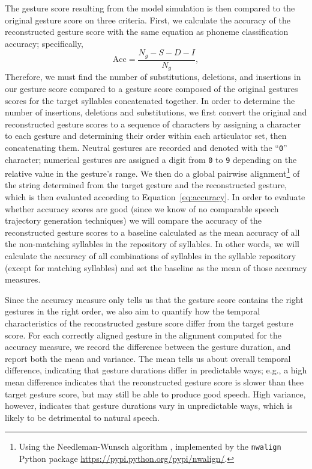 The gesture score resulting from the model simulation
is then compared to the original gesture score
on three criteria.
First, we calculate the accuracy
of the reconstructed gesture score
with the same equation as phoneme classification accuracy;
specifically,
\begin{equation} \label{eq:accuracy}
  \text{Acc} = \frac{N_g - S - D - I}{N_g},
\end{equation}
Therefore, we must find the number of
substitutions, deletions, and insertions
in our gesture score compared to
a gesture score composed of
the original gestures scores
for the target syllables
concatenated together.
In order to determine the number of
insertions, deletions and substitutions,
we first convert the original
and reconstructed gesture scores
to a sequence of characters
by assigning a character to each gesture
and determining their order
within each articulator set,
then concatenating them.
Neutral gestures are recorded
and denoted with the ``\texttt{0}'' character;
numerical gestures are assigned
a digit from \texttt{0} to \texttt{9}
depending on the relative value
in the gesture's range.
We then do a global pairwise alignment\footnote{
  Using the Needleman-Wunsch algorithm \cite{needleman1970},
  implemented by the \texttt{nwalign} Python package
  \url{https://pypi.python.org/pypi/nwalign/}.}
of the string determined
from the target gesture
and the reconstructed gesture,
which is then evaluated
according to Equation~\eqref{eq:accuracy}.
In order to evaluate whether
accuracy scores are good
(since we know of no comparable
speech trajectory generation techniques)
we will compare the accuracy
of the reconstructed gesture scores
to a baseline calculated as
the mean accuracy of all the
non-matching syllables in the
repository of syllables.
In other words, we will calculate
the accuracy of all combinations
of syllables in the syllable repository
(except for matching syllables)
and set the baseline as the mean
of those accuracy measures.

Since the accuracy measure only tells us
that the gesture score contains
the right gestures in the right order,
we also aim to quantify
how the temporal characteristics
of the reconstructed gesture score
differ from the target gesture score.
For each correctly aligned gesture
in the alignment computed
for the accuracy measure,
we record the difference
between the gesture duration,
and report both the mean and variance.
The mean tells us about
overall temporal difference,
indicating that gesture durations
differ in predictable ways;
e.g., a high mean difference
indicates that
the reconstructed gesture score
is slower than thee target gesture score,
but may still be able to
produce good speech.
High variance, however,
indicates that
gesture durations vary in unpredictable ways,
which is likely to be detrimental
to natural speech.

